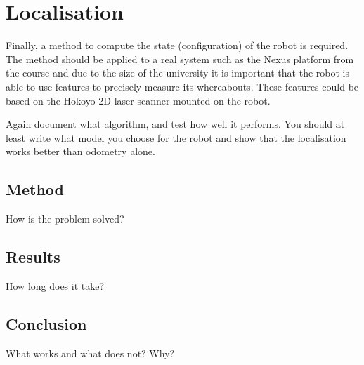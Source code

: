 \section{Localisation}
\label{sec::localisation}
Finally, a method to compute the state (configuration) of the robot is required. The method should be applied to a real system such as the Nexus platform from the course and due to the size of the university it is important that the robot is able to use features to precisely measure its whereabouts. These features could be based on the Hokoyo 2D laser scanner mounted on the robot.

Again document what algorithm, and test how well it performs. You should at least write what model you choose for the robot and show that the localisation works better than odometry alone.

\subsection{Method}
How is the problem solved? 

\subsection{Results}
How long does it take?

\subsection{Conclusion}
What works and what does not? Why?

